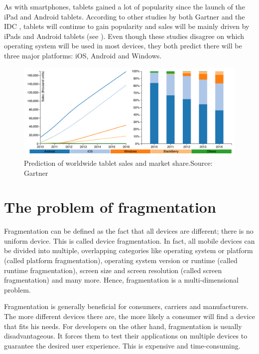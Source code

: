 As with smartphones, tablets gained a lot of popularity since the launch of the iPad and Android tablets. According to other studies by both Gartner \citep{Gartner:11tab,Gartner:12tab} and the IDC \citep{IDC:tablet}, tablets will continue to gain popularity and sales will be mainly driven by iPads and Android tablets (see ). Even though these studies disagree on which operating system will be used in most devices, they both predict there will be three major platforms: iOS, Android and Windows. 

\begin{figure}[h]
    \centering
    \includegraphics[width=\textwidth]{figs/tablet_sales.pdf}
    \caption{Prediction of worldwide tablet sales and market share.\newline Source: Gartner \citeGartnerTab}
    \label{fig:tablet}
\end{figure}

\section{The problem of fragmentation}

Fragmentation can be defined as the fact that all devices are different; there is no uniform device. This is called device fragmentation. In fact, all mobile devices can be divided into multiple, overlapping categories like operating system or platform (called platform fragmentation), operating system version or runtime (called runtime fragmentation), screen size and screen resolution (called screen fragmentation) and many more. Hence, fragmentation is a multi-dimensional problem. 

Fragmentation is generally beneficial for consumers, carriers and manufacturers. The more different devices there are, the more likely a consumer will find a device that fits his needs. For developers on the other hand, fragmentation is usually disadvantageous. It forces them to test their applications on multiple devices to guarantee the desired user experience. This is expensive and time-consuming. 

